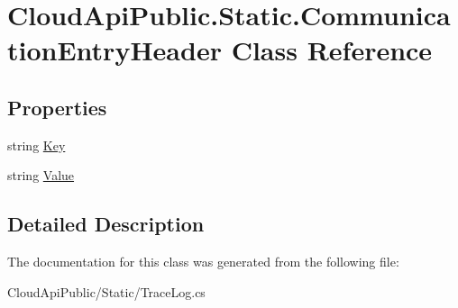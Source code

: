 \hypertarget{class_cloud_api_public_1_1_static_1_1_communication_entry_header}{\section{Cloud\-Api\-Public.\-Static.\-Communication\-Entry\-Header Class Reference}
\label{class_cloud_api_public_1_1_static_1_1_communication_entry_header}
}


 


\subsection*{Properties}
\begin{DoxyCompactItemize}
\item 
\hypertarget{class_cloud_api_public_1_1_static_1_1_communication_entry_header_a4e712cfa257f62b29539ef8c98981f66}{string \hyperlink{class_cloud_api_public_1_1_static_1_1_communication_entry_header_a4e712cfa257f62b29539ef8c98981f66}{Key}}\label{class_cloud_api_public_1_1_static_1_1_communication_entry_header_a4e712cfa257f62b29539ef8c98981f66}

\begin{DoxyCompactList}\small\item\em \end{DoxyCompactList}\item 
\hypertarget{class_cloud_api_public_1_1_static_1_1_communication_entry_header_ad34dee5eaf141260629e43ef022f6f63}{string \hyperlink{class_cloud_api_public_1_1_static_1_1_communication_entry_header_ad34dee5eaf141260629e43ef022f6f63}{Value}}\label{class_cloud_api_public_1_1_static_1_1_communication_entry_header_ad34dee5eaf141260629e43ef022f6f63}

\begin{DoxyCompactList}\small\item\em \end{DoxyCompactList}\end{DoxyCompactItemize}


\subsection{Detailed Description}


The documentation for this class was generated from the following file\-:\begin{DoxyCompactItemize}
\item 
Cloud\-Api\-Public/\-Static/Trace\-Log.\-cs\end{DoxyCompactItemize}
